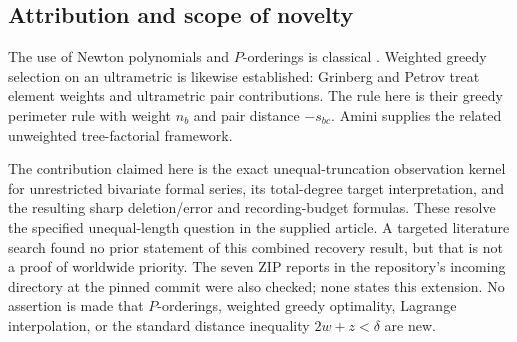 \subsection{Attribution and scope of novelty}

The use of Newton polynomials and $P$-orderings is classical
\cite{bhargava}.  Weighted greedy selection on an ultrametric is likewise
established: Grinberg and Petrov \cite{grinbergpetrov} treat element weights
and ultrametric pair contributions.  The rule here is their greedy
perimeter rule with weight $n_b$ and pair distance $-s_{bc}$.
Amini \cite{amini} supplies the related unweighted tree-factorial framework.

The contribution claimed here is the exact unequal-truncation observation
kernel for unrestricted bivariate formal series, its total-degree target
interpretation, and the resulting sharp deletion/error and recording-budget
formulas.  These resolve the specified unequal-length question in the
supplied article.  A targeted literature search found no prior statement of
this combined recovery result, but that is not a proof of worldwide priority.
The seven ZIP reports in the repository's incoming directory at the pinned
commit were also checked; none states this extension.  No assertion is made
that $P$-orderings, weighted greedy optimality, Lagrange interpolation, or the
standard distance inequality $2w+z<\delta$ are new.
